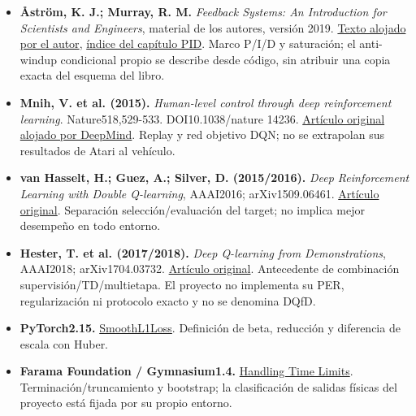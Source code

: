 \documentclass[12pt,a4paper]{article}
\begin{document}
\begin{itemize}
\item \textbf{Åström,\allowbreak{} K. J.; Murray,\allowbreak{} R. M.} \emph{Feedback Systems: An Introduction for Scientists and Engineers},\allowbreak{} material de los autores,\allowbreak{} versión 2019. \href{https://www.cds.caltech.edu/~murray/books/AM08/pdf/fbs-author_29Mar19.pdf}{Texto alojado por el autor},\allowbreak{} \href{https://www.cds.caltech.edu/~murray/FBS/Chapter_10_-_PID_Control.html}{índice del capítulo PID}. Marco P/\allowbreak{}I/\allowbreak{}D y saturación; el anti-windup condicional propio se describe desde código,\allowbreak{} sin atribuir una copia exacta del esquema del libro.
\item \textbf{Mnih,\allowbreak{} V. et al. (2015).} \emph{Human-level control through deep reinforcement learning}. Nature518,\allowbreak{}529-533. DOI10.1038/\allowbreak{}nature 14236. \href{https://storage.googleapis.com/deepmind-media/dqn/DQNNaturePaper.pdf}{Artículo original alojado por DeepMind}. Replay y red objetivo DQN; no se extrapolan sus resultados de Atari al vehículo.
\item \textbf{van Hasselt,\allowbreak{} H.; Guez,\allowbreak{} A.; Silver,\allowbreak{} D. (2015/\allowbreak{}2016).} \emph{Deep Reinforcement Learning with Double Q-learning},\allowbreak{} AAAI2016; arXiv1509.06461. \href{https://arxiv.org/html/1509.06461v3}{Artículo original}. Separación selección/\allowbreak{}evaluación del target; no implica mejor desempeño en todo entorno.
\item \textbf{Hester,\allowbreak{} T. et al. (2017/\allowbreak{}2018).} \emph{Deep Q-learning from Demonstrations},\allowbreak{} AAAI2018; arXiv1704.03732. \href{https://arxiv.org/html/1704.03732v4}{Artículo original}. Antecedente de combinación supervisión/\allowbreak{}TD/\allowbreak{}multietapa. El proyecto no implementa su PER,\allowbreak{} regularización ni protocolo exacto y no se denomina DQfD.
\item \textbf{PyTorch2.15.} \href{https://docs.pytorch.org/docs/2.15/generated/torch.nn.SmoothL1Loss.html}{SmoothL1Loss}. Definición de beta,\allowbreak{} reducción y diferencia de escala con Huber.
\item \textbf{Farama Foundation /\allowbreak{} Gymnasium1.4.} \href{https://gymnasium.farama.org/tutorials/gymnasium_basics/handling_time_limits/}{Handling Time Limits}. Terminación/\allowbreak{}truncamiento y bootstrap; la clasificación de salidas físicas del proyecto está fijada por su propio entorno.\end{itemize}
\end{document}
